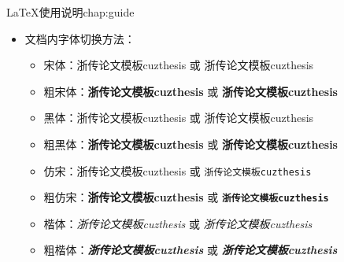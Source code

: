 \begin{cuzchapter}{\LaTeX{}使用说明}{chap:guide}
\begin{itemize}
\begin{itemize}
                  \item 参考文献行距：修改 \verb|\setlength{\bibsep}{0.0ex}|
                  \item 目录显示级数：修改 \verb|\setcounter{tocdepth}{2}|
                  \item 文档超链接的颜色及其显示：修改 \verb|\hypersetup|
              \end{itemize}
        \item 文档内字体切换方法：
              \begin{itemize}
                  \item 宋体：浙传论文模板cuzthesis 或 \textrm{浙传论文模板cuzthesis}
                  \item 粗宋体：{\bfseries 浙传论文模板cuzthesis} 或 \textbf{浙传论文模板cuzthesis}
                  \item 黑体：{\sffamily 浙传论文模板cuzthesis} 或 \textsf{浙传论文模板cuzthesis}
                  \item 粗黑体：{\bfseries\sffamily 浙传论文模板cuzthesis} 或 \textsf{\bfseries 浙传论文模板cuzthesis}
                  \item 仿宋：{\ttfamily 浙传论文模板cuzthesis} 或 \texttt{浙传论文模板cuzthesis}
                  \item 粗仿宋：{\bfseries\ttfamily 浙传论文模板cuzthesis} 或 \texttt{\bfseries 浙传论文模板cuzthesis}
                  \item 楷体：{\itshape 浙传论文模板cuzthesis} 或 \textit{浙传论文模板cuzthesis}
                  \item 粗楷体：{\bfseries\itshape 浙传论文模板cuzthesis} 或 \textit{\bfseries 浙传论文模板cuzthesis}
              \end{itemize}
    \end{itemize}

\end{cuzchapter}
